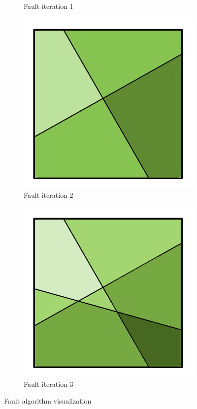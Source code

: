 \documentclass[11pt,a4paper,twoside,openright]{report}
\begin{document}
\begin{figure}[h]
\begin{subfigure}[b]{0.24\textwidth}
    \caption{Fault iteration 1}
    \label{fig:fault1}
  \end{subfigure}
  \begin{subfigure}[b]{0.24\textwidth}
    \includegraphics[width=\textwidth]{fault4.png}
    \caption{Fault iteration 2}
    \label{fig:fault2}
  \end{subfigure}
  \begin{subfigure}[b]{0.24\textwidth}
    \includegraphics[width=\textwidth]{fault6.png}
    \caption{Fault iteration 3}
    \label{fig:fault3}
  \end{subfigure}
  \caption{Fault algorithm visualization}
\end{figure}
\end{document}
